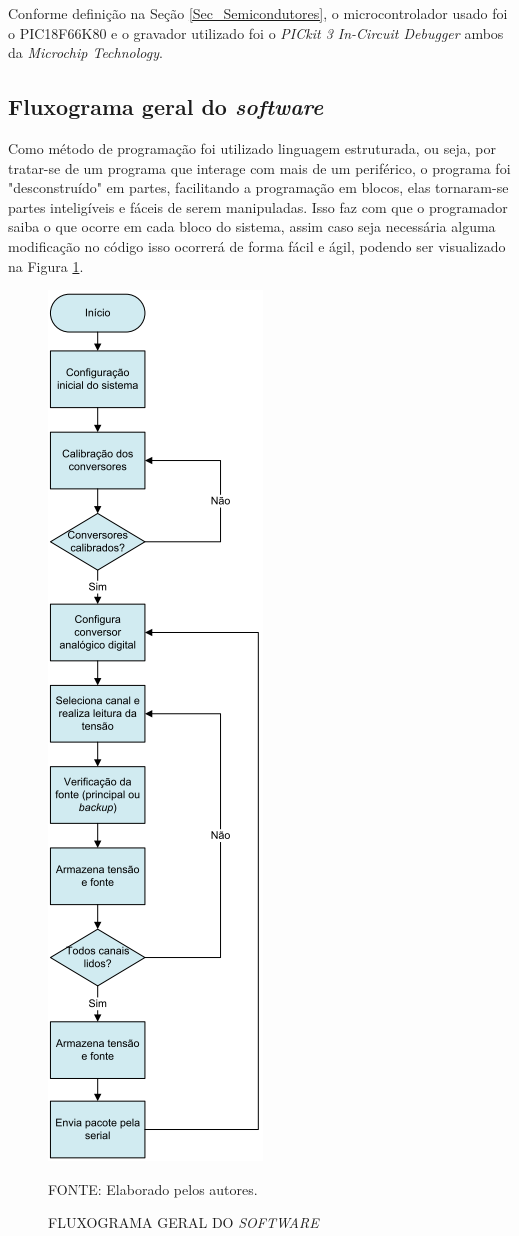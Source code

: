 \documentclass[
	12pt,				%
	openright,			%
	oneside,			%
	a4paper,			%
	english,			%
	french,				%
	spanish,			%
	brazil,				%
	oldfontcommands
	]{abntex2}
\begin{document}
	Conforme definição na Seção \ref{Sec_Semicondutores}, o microcontrolador usado foi o PIC18F66K80 e o gravador utilizado foi o \textit{PICkit 3 In-Circuit Debugger} ambos da \textit{Microchip Technology}.
	
\subsection[Fluxograma geral do software]{Fluxograma geral do \textit{software}}

	Como método de programação foi utilizado linguagem estruturada, ou seja, por tratar-se de um programa que interage com mais de um periférico, o programa foi "desconstruído" em partes, facilitando a programação em blocos, elas tornaram-se partes inteligíveis e fáceis de serem manipuladas. Isso faz com que o programador saiba o que ocorre em cada bloco do sistema, assim caso seja necessária alguma modificação no código isso ocorrerá de forma fácil e ágil, podendo ser visualizado na Figura \ref{Fig_fluxo_simples}.
	
	\begin{figure}[th]
		\caption{FLUXOGRAMA GERAL DO \textit{SOFTWARE}}
		\label{Fig_fluxo_simples}
		\centering
		\includegraphics[width=0.28\linewidth]{./figs/fluxo_simples}
			
		\begin{small}
			FONTE: Elaborado pelos autores.
		\end{small}
	\end{figure}
	\pagebreak
	
\end{document}

